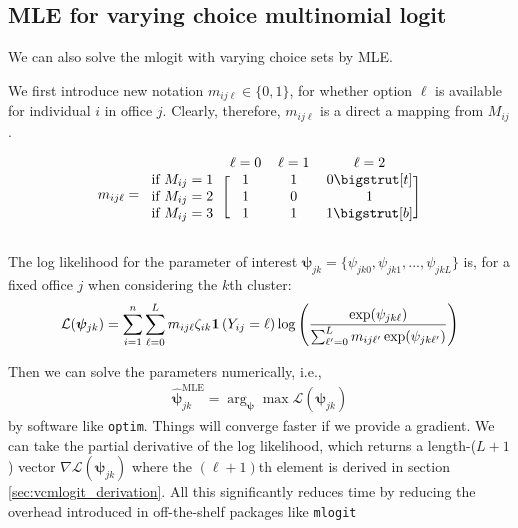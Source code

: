 \documentclass[11pt]{article}
\begin{document}
\subsection{MLE for varying choice multinomial logit}

We can also solve the mlogit with varying choice sets by MLE.

We first introduce new notation \(m_{ij\ell} \in \{0, 1\}\), for whether option \(\ell\) is available for individual \(i\) in office \(j\). Clearly, therefore, \(m_{ij\ell}\) is a direct a mapping from \(M_{ij}\).

\begin{align*}
m_{ij\ell} = \begin{blockarray}{cccc}
 & \ell = 0 & \ell = 1 & \ell = 2\\
\begin{block}{c[ccc]}
\text{if } M_{ij} = 1 & 1 & 1 & 0\bigstrut[t] \\
\text{if } M_{ij} = 2 & 1 & 0 & 1 \\
\text{if } M_{ij} = 3 & 1 & 1 & 1\bigstrut[b]\\
\end{block}
\end{blockarray}\vspace*{-1.25\baselineskip}
\end{align*}

The log likelihood for the parameter of interest \(\bm{\psi}_{jk} = \{\psi_{jk0}, \psi_{jk1}, ... , \psi_{jkL}\}\) is, for a fixed office \(j\) when considering the \(k\)th cluster:
\begin{align}
\mathcal{L}(\bm{\psi}_{jk}) = \sum^n_{i=1}\sum^{L}_{\ell = 0} m_{ij\ell}\zeta_{ik} \bm{1}\left(Y_{ij} = \ell\right) \log\left(\frac{\exp(\psi_{jk\ell})}{\sum_{\ell^\prime = 0}^{L} m_{ij\ell^\prime} \exp(\psi_{jk\ell^\prime})} \right) \label{eq:mlogit_ll}
\end{align}

Then we can solve the parameters numerically, i.e.,
\begin{align}
\widehat{\bm{\psi}}^{\text{MLE}}_{jk} = \arg_{\bm{\psi}}\max \mathcal{L}(\bm{\psi}_{jk})
\end{align}
by software like \texttt{optim}. Things will converge faster if we provide a gradient. We can take the partial derivative of the log likelihood, which returns a length-($L + 1$) vector $\nabla \mathcal{L}(\bm{\psi}_{jk})$ where the $(\ell+1)$th element is derived in section \ref{sec:vcmlogit_derivation}. All this significantly reduces time by reducing the overhead introduced in off-the-shelf packages like \texttt{mlogit}
\end{document}
